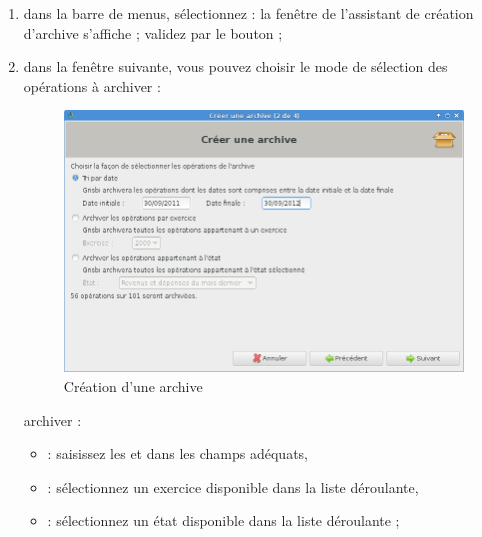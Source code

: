\begin{enumerate}
	\item dans la barre de menus, sélectionnez  : la fenêtre de l'assistant de création d'archive s'affiche ; validez par le bouton  ;
	\item dans la fenêtre suivante, vous pouvez choisir le mode de sélection des opérations à \ifIllustration archiver :
	\begin{figure}[htbp]
	\begin{center}
	\includegraphics[scale=0.5]{image/screenshot/datamanagement_history_create}
	\end{center}
	\caption{Création d'une archive}
	\label{datamanagement-history-create-img}
	\end{figure}
	\else archiver :
	\fi
	
		\begin{itemize}
			\item {} : saisissez les  et  dans les champs adéquats,
			\item {} : sélectionnez un exercice disponible dans la liste déroulante,
			\item {} : sélectionnez un état disponible dans la liste déroulante ;


\end{itemize}
\end{enumerate}
